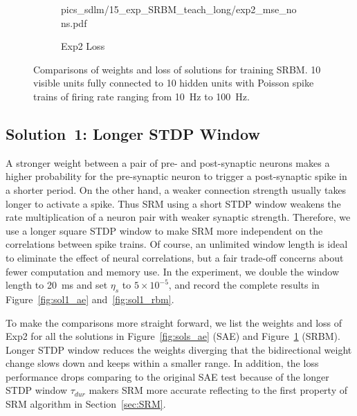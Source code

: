 \begin{figure}
\begin{subfigure}[c]{0.45\textwidth}
{			{pics_sdlm/15_exp_SRBM_teach_long/exp2_mse_nons.pdf}}\\
		\caption{Exp2 Loss}
	\end{subfigure}%
	\caption{Comparisons of weights and loss of solutions for training SRBM. 10 visible units fully connected to 10 hidden units with Poisson spike trains of firing rate ranging from 10~Hz to 100~Hz.}
	\label{fig:sols_rbm}
\end{figure}

\subsection{Solution~1: Longer STDP Window}
A stronger weight between a pair of pre- and post-synaptic neurons makes a higher probability for the pre-synaptic neuron to trigger a post-synaptic spike in a shorter period.
On the other hand, a weaker connection strength usually takes longer to activate a spike.
Thus SRM using a short STDP window weakens the rate multiplication of a neuron pair with weaker synaptic strength.
Therefore, we use a longer square STDP window to make SRM more independent on the correlations between spike trains.
Of course, an unlimited window length is ideal to eliminate the effect of neural correlations, but a fair trade-off concerns about fewer computation and memory use.
In the experiment, we double the window length to 20~ms and set $\eta_s$ to $5 \times 10^{-5}$, and record the complete results in Figure~\ref{fig:sol1_ae} and~\ref{fig:sol1_rbm}.

To make the comparisons more straight forward, we list the weights and loss of Exp2 for all the solutions in Figure~\ref{fig:sols_ae} (SAE) and Figure~\ref{fig:sols_rbm} (SRBM).
Longer STDP window reduces the weights diverging that the bidirectional weight change slows down and keeps within a smaller range.
In addition, the loss performance drops comparing to the original SAE test because of the longer STDP window $\tau_{dur}$ makers SRM more accurate reflecting to the first property of SRM algorithm in Section~\ref{sec:SRM}.



